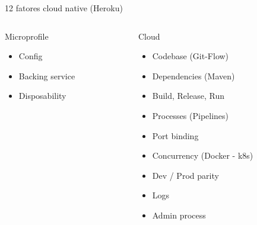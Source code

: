 \documentclass[aspectratio=169]{beamer}
\begin{document}
\begin{frame}{12 fatores cloud native (Heroku)}

\begin{columns}[T] %

	\begin{column}[T]{4cm} %
		\begin{alertblock}{Microprofile}
	\begin{itemize}
		\item Config
		\item Backing service
		\item Disposability
	\end{itemize}
\end{alertblock}
	\end{column}
	\begin{column}[T]{6cm} %
		\begin{block}{Cloud}
	\begin{itemize}
	\item Codebase (Git-Flow)
	\item Dependencies (Maven)
	\item Build, Release, Run
	\item Processes (Pipelines)
	\item Port binding
	\item Concurrency (Docker - k8s)
	\item Dev / Prod parity
	\item Logs
	\item Admin process
\end{itemize}
\end{block}
	\end{column}
\end{columns}

\end{frame}
\end{document}
